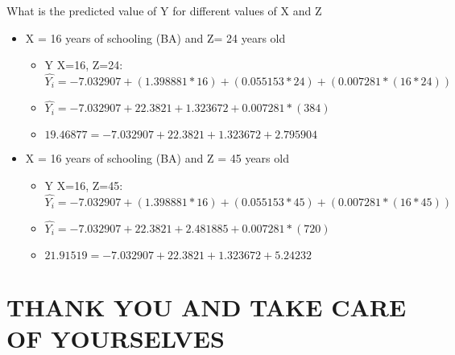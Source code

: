 \documentclass[8pt,ignorenonframetext,dvipsnames]{beamer}
\providecommand{\tightlist}{%
  \setlength{\itemsep}{0pt}\setlength{\parskip}{0pt}}
\let\olditem\item
\renewcommand{\item}{%
  \olditem\vspace{4pt}
}
\begin{document}
\begin{frame}{What is the predicted value of Y for different values of X
and Z}
\protect\hypertarget{what-is-the-predicted-value-of-y-for-different-values-of-x-and-z}{}

\begin{itemize}
\tightlist
\item
  X = 16 years of schooling (BA) and Z= 24 years old

  \begin{itemize}
  \tightlist
  \item
    Y \textbar{}X=16, Z=24:
    \(\hat{Y_i} = -7.032907 + (1.398881*16) + (0.055153*24) + (0.007281*(16*24))\)
  \item
    \(\hat{Y_i} = -7.032907 + 22.3821 + 1.323672 + 0.007281*(384)\)
  \item
    \(19.46877 = -7.032907 + 22.3821 + 1.323672 + 2.795904\)
  \end{itemize}
\end{itemize}

\medskip

\begin{itemize}
\tightlist
\item
  X = 16 years of schooling (BA) and Z = 45 years old

  \begin{itemize}
  \tightlist
  \item
    Y \textbar{}X=16, Z=45:
    \(\hat{Y_i} = -7.032907 + (1.398881*16) + (0.055153*45) + (0.007281*(16*45))\)
  \item
    \(\hat{Y_i} = -7.032907 + 22.3821 + 2.481885+ 0.007281*(720)\)
  \item
    \(21.91519 = -7.032907 + 22.3821 + 1.323672 + 5.24232\)
  \end{itemize}
\end{itemize}

\end{frame}

\hypertarget{thank-you-and-take-care-of-yourselves}{%
\section{THANK YOU AND TAKE CARE OF
YOURSELVES}\label{thank-you-and-take-care-of-yourselves}}
\end{document}
